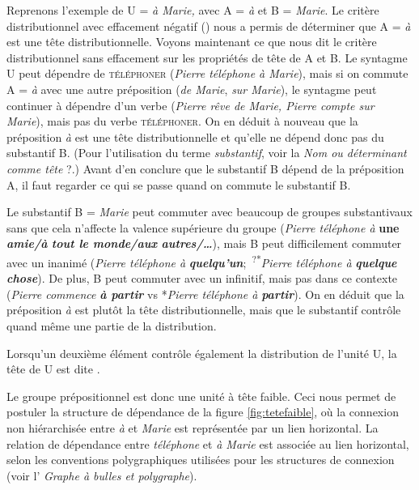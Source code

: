 Reprenons l’exemple de U = \textit{à Marie,} avec A = \textit{à} et B = \textit{Marie}. Le critère distributionnel avec effacement négatif () nous a permis de déterminer que A = \textit{à} est une tête distributionnelle. Voyons maintenant ce que nous dit le critère distributionnel sans effacement sur les propriétés de tête de A et B. Le syntagme U peut dépendre de \textsc{téléphoner} (\textit{Pierre téléphone à Marie}), mais si on commute A = \textit{à} avec une autre préposition (\textit{de Marie}, \textit{sur Marie}), le syntagme peut continuer à dépendre d’un verbe (\textit{Pierre rêve de Marie, Pierre compte sur Marie}), mais pas du verbe \textsc{téléphoner}. On en déduit à nouveau que la préposition \textit{à} est une tête distributionnelle et qu’elle ne dépend donc pas du substantif B. (Pour l’utilisation du terme \textit{substantif}, voir la  \textit{Nom ou déterminant comme tête} ?.) Avant d’en conclure que le substantif B dépend de la préposition A, il faut regarder ce qui se passe quand on commute le substantif B.

Le substantif B = \textit{Marie} peut commuter avec beaucoup de groupes substantivaux sans que cela n’affecte la valence supérieure du groupe (\textit{Pierre téléphone à} \textbf{\textbf{une} \textit{amie/à} \textit{tout le monde/aux} \textit{autres/…}}), mais B peut difficilement commuter avec un inanimé (\textit{Pierre téléphone à} \textbf{\textit{quelqu’un}};~\textsuperscript{?*}\textit{Pierre téléphone à} \textbf{\textit{quelque chose}}). De plus, B peut commuter avec un infinitif, mais pas dans ce contexte (\textit{Pierre commence} \textbf{\textit{à partir}} vs *\textit{Pierre téléphone à} \textbf{\textit{partir}}). On en déduit que la préposition \textit{à} est plutôt la tête distributionnelle, mais que le substantif contrôle quand même une partie de la distribution.

{Lorsqu’un deuxième élément contrôle également la distribution de l’unité U, la tête de U est dite .}

Le groupe prépositionnel est donc une unité à tête faible. 
Ceci nous permet de postuler la structure de dépendance de la figure \ref{fig:tetefaible}, où la connexion non hiérarchisée entre \textit{à} et \textit{Marie} est représentée par un lien horizontal. La relation de dépendance entre \textit{téléphone} et \textit{à Marie} est associée au lien horizontal, selon les conventions polygraphiques utilisées pour les structures de connexion (voir l’ \textit{Graphe à bulles et polygraphe}). 

